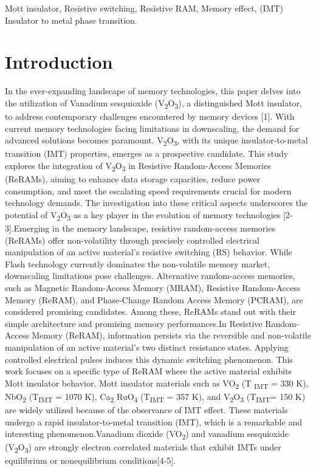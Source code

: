 \documentclass[conference]{IEEEtran}
\begin{document}
\begin{IEEEkeywords}
	Mott insulator, Resistive switching, Resistive RAM, Memory effect, (IMT) Insulator to metal phase transition.
\end{IEEEkeywords}

\section{Introduction}
In the ever-expanding landscape of memory technologies, this paper delves into the utilization of Vanadium sesquioxide (V\textsubscript{2}O\textsubscript{3}), a distinguished Mott insulator, to address contemporary challenges encountered by memory devices [1]. With current memory technologies facing limitations in downscaling, the demand for advanced solutions becomes paramount. V\textsubscript{2}O\textsubscript{3}, with its unique insulator-to-metal transition (IMT) properties, emerges as a prospective candidate. This study explores the integration of V\textsubscript{2}O\textsubscript{3} in Resistive Random-Access Memories (ReRAMs), aiming to enhance data storage capacities, reduce power consumption, and meet the escalating speed requirements crucial for modern technology demands. The investigation into these critical aspects underscores the potential of V\textsubscript{2}O\textsubscript{3} as a key player in the evolution of memory technologies [2-3].Emerging in the memory landscape, resistive random-access memories (ReRAMs) offer non-volatility through precisely controlled electrical manipulation of an active material's resistive switching (RS) behavior. While Flash technology currently dominates the non-volatile memory market, downscaling limitations pose challenges. Alternative random-access memories, such as  Magnetic Random-Access Memory (MRAM), Resistive Random-Access Memory (ReRAM), and Phase-Change Random Access Memory (PCRAM), are considered promising candidates. Among these, ReRAMs stand out with their simple architecture and promising memory performances.In Resistive Random-Access Memory (ReRAM), information persists via the reversible and non-volatile manipulation of an active material's two distinct resistance states. Applying controlled electrical pulses induces this dynamic switching phenomenon. This work focuses on a specific type of ReRAM where the active material exhibits Mott insulator behavior. Mott insulator materials such as VO\textsubscript{2} (T \textsubscript{IMT} = 330 K), NbO\textsubscript{2} (T\textsubscript{IMT} = 1070 K), Ca\textsubscript{2} RuO\textsubscript{4} (T\textsubscript{IMT} = 357 K), and V\textsubscript{2}O\textsubscript{3} (T\textsubscript{IMT}= 150 K) are widely utilized because of the observance of IMT effect. These materials undergo a rapid insulator-to-metal transition (IMT), which is a remarkable and interesting phenomenon.Vanadium dioxide (VO\textsubscript{2}) and vanadium sesquioxide (V\textsubscript{2}O\textsubscript{3}) are strongly electron correlated materials that exhibit IMTs under equilibrium or nonequilibrium conditions[4-5].
\end{document}

